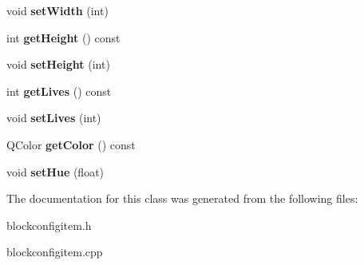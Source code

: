 \begin{DoxyCompactItemize}
\item 
\hypertarget{classBlockConfigItem_a98fbcad50cb8a7bd2e637f139d426d33}{void {\bfseries set\-Width} (int)}\label{classBlockConfigItem_a98fbcad50cb8a7bd2e637f139d426d33}

\item 
\hypertarget{classBlockConfigItem_a216bc2cdf3b351900d7b621250ca803e}{int {\bfseries get\-Height} () const }\label{classBlockConfigItem_a216bc2cdf3b351900d7b621250ca803e}

\item 
\hypertarget{classBlockConfigItem_a70e7d230c8116ae104a21bfaa7007a6f}{void {\bfseries set\-Height} (int)}\label{classBlockConfigItem_a70e7d230c8116ae104a21bfaa7007a6f}

\item 
\hypertarget{classBlockConfigItem_a6970ee35a9fca796deeffa002b7a3efb}{int {\bfseries get\-Lives} () const }\label{classBlockConfigItem_a6970ee35a9fca796deeffa002b7a3efb}

\item 
\hypertarget{classBlockConfigItem_ae359c77e2804984f1a0b6f75643d9257}{void {\bfseries set\-Lives} (int)}\label{classBlockConfigItem_ae359c77e2804984f1a0b6f75643d9257}

\item 
\hypertarget{classBlockConfigItem_ab8892b6722c7201f0a3faad0c1860c9d}{Q\-Color {\bfseries get\-Color} () const }\label{classBlockConfigItem_ab8892b6722c7201f0a3faad0c1860c9d}

\item 
\hypertarget{classBlockConfigItem_aceeb33135f45c110b057359fac7ccab3}{void {\bfseries set\-Hue} (float)}\label{classBlockConfigItem_aceeb33135f45c110b057359fac7ccab3}

\end{DoxyCompactItemize}


The documentation for this class was generated from the following files\-:\begin{DoxyCompactItemize}
\item 
blockconfigitem.\-h\item 
blockconfigitem.\-cpp\end{DoxyCompactItemize}
